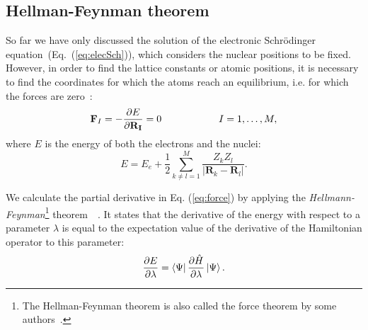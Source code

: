 \begin{refsection}

\subsection{Hellman-Feynman theorem} \label{dft:sec-hellmann}

So far we have only discussed the solution of the electronic Schr\"odinger equation~(Eq.~(\ref{eq:elecSch})), which considers the nuclear positions to be fixed. However, in order to find the lattice constants or atomic positions, it is necessary to find the coordinates for which the atoms reach an equilibrium, i.e. for which the forces are zero~\cite{Martin2004}:
\begin{equation}\label{eq:force}
\mathbf{F}_I = - \frac{\partial E}{\partial \mathbf{R_I}} = 0 \hspace{0.8in} I = 1,\hdots, M,
\end{equation}
where $E$ is the energy of both the electrons and the nuclei:
\begin{equation}
E = E_e + \frac{1}{2} \sum_{k\neq l = 1}^{M}\frac{Z_k Z_l}{\left| \mathbf{R}_k - \mathbf{R}_l \right|}.
\end{equation}

We calculate the partial derivative in Eq. (\ref{eq:force}) by applying the \textit{Hellmann-Feynman}\footnote{The Hellman-Feynman theorem is also called the force theorem by some authors~\cite{Martin2004}.} theorem~\cite{Feynman1939}~\cite{Hellmann1937}. It states that the derivative of the energy with respect to a parameter $\lambda$ is equal to the expectation value of the derivative of the Hamiltonian operator to this parameter:
\begin{equation}
\frac{\partial E}{\partial \lambda} = \bra{\Psi} \frac{\partial \hat{H}}{\partial \lambda} \ket{\Psi}.
\end{equation}


\end{refsection}
